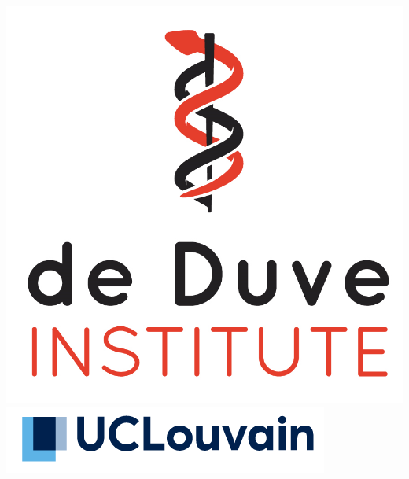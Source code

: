 \documentclass{article}
\begin{document}
\begin{center}
{\begin{minipage}{3.7cm}
      \includegraphics[width=0.7\linewidth, right]{figs/deduve.png} \\
      \vspace{0.5cm}
      \includegraphics[width=1.1\linewidth, right]{figs/ucl.png}
  \end{minipage}
}
\end{center}


\end{document}
